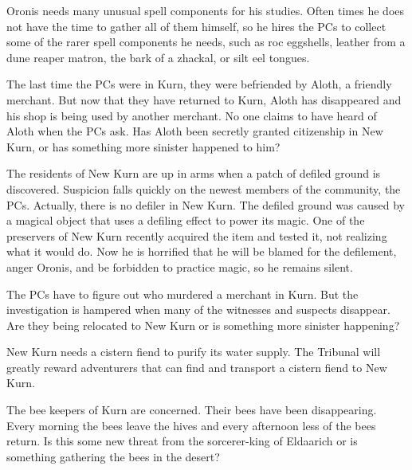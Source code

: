 {
	\item Oronis needs many unusual spell components for his studies. Often times he does not have the time to gather all of them himself, so he hires the PCs to collect some of the rarer spell components he needs, such as roc eggshells, leather from a dune reaper matron, the bark of a zhackal, or silt eel tongues.
	\item The last time the PCs were in Kurn, they were befriended by Aloth, a friendly merchant. But now that they have returned to Kurn, Aloth has disappeared and his shop is being used by another merchant. No one claims to have heard of Aloth when the PCs ask. Has Aloth been secretly granted citizenship in New Kurn, or has something more sinister happened to him?
	\item The residents of New Kurn are up in arms when a patch of defiled ground is discovered. Suspicion falls quickly on the newest members of the community, the PCs. Actually, there is no defiler in New Kurn. The defiled ground was caused by a magical object that uses a defiling effect to power its magic. One of the preservers of New Kurn recently acquired the item and tested it, not realizing what it would do. Now he is horrified that he will be blamed for the defilement, anger Oronis, and be forbidden to practice magic, so he remains silent.
	\item The PCs have to figure out who murdered a merchant in Kurn. But the investigation is hampered when many of the witnesses and suspects disappear. Are they being relocated to New Kurn or is something more sinister happening?
	\item New Kurn needs a cistern fiend to purify its water supply. The Tribunal will greatly reward adventurers that can find and transport a cistern fiend to New Kurn.
	\item The bee keepers of Kurn are concerned. Their bees have been disappearing. Every morning the bees leave the hives and every afternoon less of the bees return. Is this some new threat from the sorcerer-king of Eldaarich or is something gathering the bees in the desert?
}